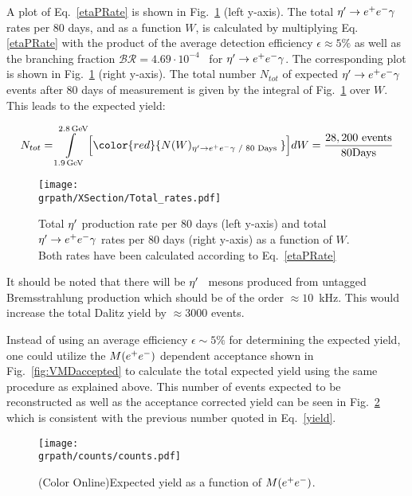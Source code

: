 A plot of Eq.~\ref{etaPRate} is shown in Fig.~\ref{fig:EtaPRate} (left y-axis). The total $\eta^{\prime}\rightarrow e^+e^-\gamma$ rates per 80 days, and as a function $W$, is calculated by multiplying Eq.\ref{etaPRate} with the product of the average detection efficiency $\epsilon\approx 5\%$ as well as the branching fraction $\mathcal{BR} = 4.69\cdot10^{-4}$~\cite{BESIII} for $\eta^{\prime}\rightarrow e^+e^-\gamma$. The corresponding plot is shown in Fig.~\ref{fig:EtaPRate} (right y-axis). The total number $N_{tot}$ of expected $\eta^{\prime}\rightarrow e^+e^-\gamma$ events after 80 days of measurement is given by the integral of Fig.~\ref{fig:EtaPRate} over $W$. This leads to the expected yield:

\begin{equation}
  N_{tot} = \int\limits_{1.9\,\rm{GeV}}^{2.8\,\rm{GeV}} \Big[ {\color{red}{N(W)_{\etaP\rightarrow\epem\gamma\text{ / 80 Days }}}} \Big]dW = \mathrm{\frac{28,200 \ events}{80 Days}}
\label{yield}
\end{equation}


\begin{figure}[h!]\begin{center}
		\texttt{[image: \\grpath/XSection/Total\_rates.pdf]}\\
		\caption[etaP rates]{\label{fig:EtaPRate}{Total $\eta^{\prime}$ production rate per 80 days (left y-axis) and total $\eta^{\prime}\rightarrow e^+e^-\gamma$ rates per 80 days (right y-axis) as a function of $W$. Both rates have been calculated according to Eq.~\ref{etaPRate}}}
\end{center}\end{figure}

It should be noted that there will be $\eta^{\prime}$ \ mesons produced from untagged Bremsstrahlung production which should be of the order $\approx 10$~kHz. This would increase the total Dalitz yield by $\approx$3000 events. 

Instead of using an average efficiency $\epsilon \sim 5\%$ for determining the expected yield, one could utilize the $M(\epem)$ dependent acceptance shown in Fig.~\ref{fig:VMDaccepted} to calculate the total expected yield using the same procedure as explained above. This number of events expected to be reconstructed as well as the acceptance corrected yield can be seen in Fig.~\ref{fig:counts} which is consistent with the previous number quoted in Eq.~\ref{yield}.

\begin{figure}[h!]\begin{center}
		\texttt{[image: \\grpath/counts/counts.pdf]}
		\caption[Acceptance as a function of $M(\epem)$]{\label{fig:counts}{(Color Online)Expected yield as a function of $M(\epem)$.}}
	\end{center}\end{figure}

